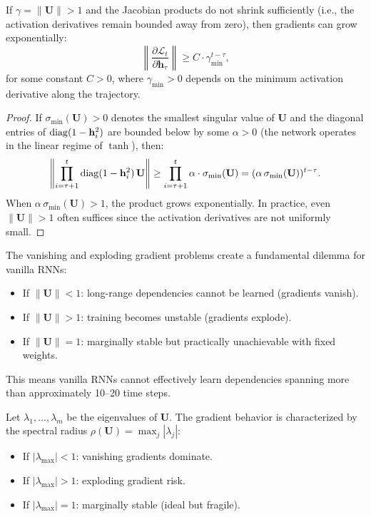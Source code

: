 \documentclass[11pt,a4paper]{article}
\begin{document}
\begin{theorem}
\label{thm:exploding}
If $\gamma = \|\mathbf{U}\| > 1$ and the Jacobian products do not
shrink sufficiently (i.e., the activation derivatives remain bounded
away from zero), then gradients can grow exponentially:
\begin{equation}
  \left\|\frac{\partial \mathcal{L}_t}{\partial \mathbf{h}_\tau}
  \right\| \geq C \cdot \gamma_{\min}^{t - \tau},
  \label{eq:exploding}
\end{equation}
for some constant $C > 0$, where $\gamma_{\min} > 0$ depends on the
minimum activation derivative along the trajectory.
\end{theorem}

\begin{proof}
If $\sigma_{\min}(\mathbf{U}) > 0$ denotes the smallest singular
value of $\mathbf{U}$ and the diagonal entries of
$\operatorname{diag}(1 - \mathbf{h}_i^2)$ are bounded below by some
$\alpha > 0$ (the network operates in the linear regime of $\tanh$),
then:
\[
  \left\|\prod_{i=\tau+1}^{t} \operatorname{diag}(1 - \mathbf{h}_i^2)\,
    \mathbf{U}\right\|
  \geq \prod_{i=\tau+1}^{t} \alpha \cdot \sigma_{\min}(\mathbf{U})
  = (\alpha \, \sigma_{\min}(\mathbf{U}))^{t-\tau}.
\]
When $\alpha \, \sigma_{\min}(\mathbf{U}) > 1$, the product grows
exponentially.  In practice, even $\|\mathbf{U}\| > 1$ often
suffices since the activation derivatives are not uniformly small.
\end{proof}

\begin{warning}[title={The Gradient Dilemma}]
The vanishing and exploding gradient problems create a fundamental
dilemma for vanilla RNNs:
\begin{itemize}[nosep]
  \item If $\|\mathbf{U}\| < 1$: long-range dependencies cannot be
    learned (gradients vanish).
  \item If $\|\mathbf{U}\| > 1$: training becomes unstable (gradients
    explode).
  \item If $\|\mathbf{U}\| = 1$: marginally stable but practically
    unachievable with fixed weights.
\end{itemize}
This means vanilla RNNs cannot effectively learn dependencies
spanning more than approximately 10--20 time steps.
\end{warning}

\begin{proposition}
\label{prop:eigenvalue}
Let $\lambda_1, \ldots, \lambda_m$ be the eigenvalues of
$\mathbf{U}$.  The gradient behavior is characterized by the
spectral radius $\rho(\mathbf{U}) = \max_j |\lambda_j|$:
\begin{itemize}[nosep]
  \item If $|\lambda_{\max}| < 1$: vanishing gradients dominate.
  \item If $|\lambda_{\max}| > 1$: exploding gradient risk.
  \item If $|\lambda_{\max}| = 1$: marginally stable (ideal but
    fragile).
\end{itemize}
\end{proposition}
\end{document}
